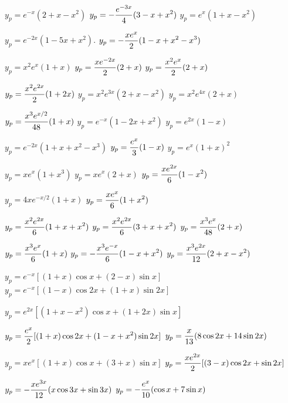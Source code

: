 \medskip

 $y_{p}=e^{-x}(2+x-x^{2})$
 $y_{p}=-\displaystyle\frac{e^{-3x}}{4}(3-x+x^{2})$
 $y_{p}=e^{x}(1+x-x^{2})$

 $y_{p}=e^{-2x}(1-5x+x^{2})$.
 $y_{p}=-\displaystyle\frac{xe^{x}}{2}(1-x+x^{2}-x^{3})$

 $y_{p}=x^{2}e^{x}(1+x)$
 $y_{p}=\displaystyle\frac{xe^{-2x}}{2}(2+x)$
 $y_{p}=\displaystyle\frac{x^{2}e^{x}}{2}(2+x)$

 $y_{p}=\displaystyle\frac{x^{2}e^{2x}}{2}(1+2x)$
 $y_{p}=x^{2}e^{3x}(2+x-x^{2})$
 $y_{p}=x^{2}e^{4x}(2+x)$

 $y_{p}=\displaystyle\frac{x^{3}e^{x/2}}{48}(1+x)$
 $y_{p}=e^{-x}(1-2x+x^{2})$
 $y_{p}=e^{2x}(1-x)$

 $y_{p}=e^{-2x}(1+x+x^{2}-x^{3})$
 $y_{p}=\displaystyle\frac{e^{x}}{3}(1-x)$
 $y_{p}=e^{x}(1+x)^{2}$

 $y_{p}=xe^{x}(1+x^{3})$
 $y_{p}=xe^{x}(2+x)$
 $y_{p}=\displaystyle\frac{xe^{2x}}{6}(1-x^{2})$

 $y_{p}=4xe^{-x/2}(1+x)$
 $y_{p}=\displaystyle\frac{xe^{x}}{6}(1+x^{2})$

   $y_{p}=\displaystyle\frac{x^{2}e^{2x}}{6}(1+x+x^{2})$
   $y_{p}=\displaystyle\frac{x^{2}e^{2x}}{6}(3+x+x^{2})$
 $y_{p}=\displaystyle\frac{x^{3}e^{x}}{48}(2+x)$

  $y_{p}=\displaystyle\frac{x^{3}e^{x}}{6}(1+x)$
  $y_{p}=-\displaystyle\frac{x^{3}e^{-x}}{6}(1-x+x^{2})$
  $y_{p}=\displaystyle\frac{x^{3}e^{2x}}{12}(2+x-x^{2})$

 $y_{p}=e^{-x}\left[(1+x)\cos x+(2-x)\sin x\right]$
 $y_{p}=e^{-x}\left[(1-x)\cos2x+(1+x)\sin2
x\right]$

 $y_{p}=e^{2x}[(1+x-x^{2})\cos x+(1+2x)\sin
x]$

 $y_{p}=\displaystyle\frac{e^{x}}{2}[(1+x)\cos
2x+(1-x+x^{2})\sin2x]$
 $y_{p}=\displaystyle\frac{x}{13}(8\cos2x+14\sin2x)$

 $y_{p}=xe^{x}[(1+x)\cos x+(3+x)\sin x]$
 $y_{p}=\displaystyle\frac{xe^{2x}}{2}[(3-x)\cos
2x+\sin2x]$

 $y_{p}=-\displaystyle\frac{xe^{3x}}{12}(x\cos
3x+\sin3x)$
 $y_{p}=-\displaystyle\frac{e^{x}}{10}(\cos x+7\sin x)$

